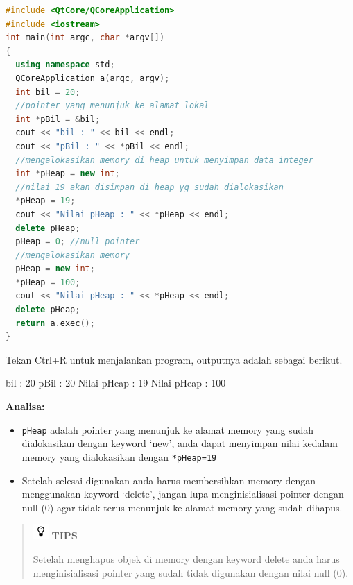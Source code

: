 \begin{lstlisting}[language=c++, caption=Mengalokasikan menggunakan dan mendelete Pointer, label=contoh5-5]
#include <QtCore/QCoreApplication>
#include <iostream>
int main(int argc, char *argv[])
{
  using namespace std;
  QCoreApplication a(argc, argv);
  int bil = 20;
  //pointer yang menunjuk ke alamat lokal
  int *pBil = &bil;
  cout << "bil : " << bil << endl;
  cout << "pBil : " << *pBil << endl;
  //mengalokasikan memory di heap untuk menyimpan data integer
  int *pHeap = new int;
  //nilai 19 akan disimpan di heap yg sudah dialokasikan
  *pHeap = 19;
  cout << "Nilai pHeap : " << *pHeap << endl;
  delete pHeap;
  pHeap = 0; //null pointer
  //mengalokasikan memory
  pHeap = new int;
  *pHeap = 100;
  cout << "Nilai pHeap : " << *pHeap << endl;
  delete pHeap;
  return a.exec();
}
\end{lstlisting}

Tekan Ctrl+R untuk menjalankan program, outputnya adalah sebagai
berikut.

\begin{lcverbatim}
bil : 20
pBil : 20
Nilai pHeap : 19
Nilai pHeap : 100
\end{lcverbatim}

\textbf{Analisa:}

\begin{itemize}

\item
  \texttt{pHeap} adalah pointer yang menunjuk ke alamat memory yang
  sudah dialokasikan dengan keyword `new', anda dapat menyimpan nilai
  kedalam memory yang dialokasikan dengan \texttt{*pHeap=19}
\item
  Setelah selesai digunakan anda harus membersihkan memory dengan
  menggunakan keyword `delete', jangan lupa menginisialisasi pointer
  dengan null (0) agar tidak terus menunjuk ke alamat memory yang sudah
  dihapus.
\end{itemize}


 
 \begin{quotation}
 \includegraphics{../manuscript/images/tips.png} 	 \textbf{TIPS}
 	 
 	 Setelah menghapus objek di memory dengan keyword delete anda harus
 	 menginisialisasi pointer yang sudah tidak digunakan dengan nilai null
 	 (0).
 \end{quotation} 

